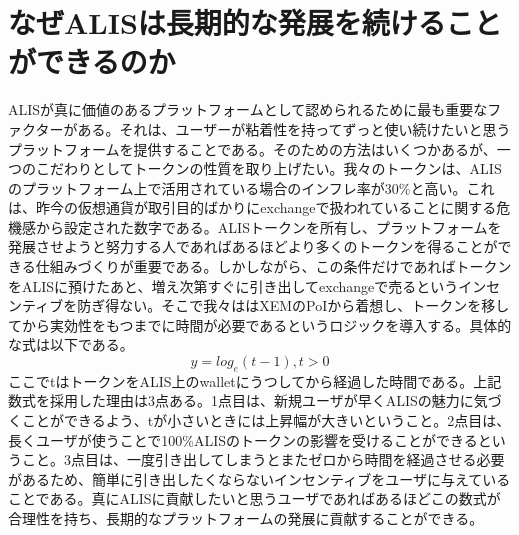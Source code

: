 \documentclass{jsarticle}
\begin{document}
\section{なぜALISは長期的な発展を続けることができるのか}
ALISが真に価値のあるプラットフォームとして認められるために最も重要なファクターがある。それは、ユーザーが粘着性を持ってずっと使い続けたいと思うプラットフォームを提供することである。そのための方法はいくつかあるが、一つのこだわりとしてトークンの性質を取り上げたい。我々のトークンは、ALISのプラットフォーム上で活用されている場合のインフレ率が30\%と高い。これは、昨今の仮想通貨が取引目的ばかりにexchangeで扱われていることに関する危機感から設定された数字である。ALISトークンを所有し、プラットフォームを発展させようと努力する人であればあるほどより多くのトークンを得ることができる仕組みづくりが重要である。しかしながら、この条件だけであればトークンをALISに預けたあと、増え次第すぐに引き出してexchangeで売るというインセンティブを防ぎ得ない。そこで我々ははXEMのPoIから着想し、トークンを移してから実効性をもつまでに時間が必要であるというロジックを導入する。具体的な式は以下である。
\begin{equation}
y = log_e(t-1) , t > 0
\end{equation}
ここでtはトークンをALIS上のwalletにうつしてから経過した時間である。上記数式を採用した理由は3点ある。1点目は、新規ユーザが早くALISの魅力に気づくことができるよう、tが小さいときには上昇幅が大きいということ。2点目は、長くユーザが使うことで100\%ALISのトークンの影響を受けることができるということ。3点目は、一度引き出してしまうとまたゼロから時間を経過させる必要があるため、簡単に引き出したくならないインセンティブをユーザに与えていることである。真にALISに貢献したいと思うユーザであればあるほどこの数式が合理性を持ち、長期的なプラットフォームの発展に貢献することができる。
\end{document}
